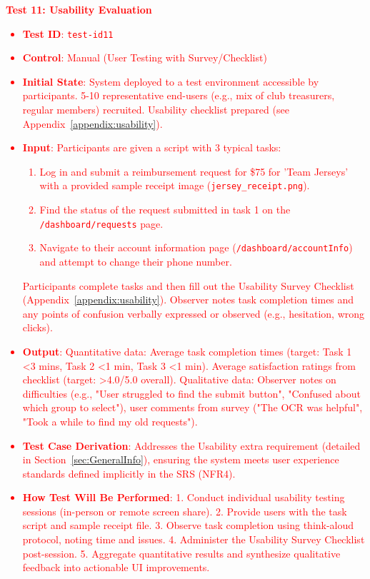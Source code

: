 \documentclass[12pt, titlepage]{article}
\begin{document}
\textcolor{red}{
\textbf{Test 11: Usability Evaluation} \label{test-id11}
\begin{itemize}
    \item \textbf{Test ID}: \texttt{test-id11}
    \item \textbf{Control}: Manual (User Testing with Survey/Checklist)
    \item \textbf{Initial State}: System deployed to a test environment accessible by participants. 5-10 representative end-users (e.g., mix of club treasurers, regular members) recruited. Usability checklist prepared (see Appendix~\ref{appendix:usability}).
    \item \textbf{Input}: Participants are given a script with 3 typical tasks:
        \begin{enumerate}
            \item Log in and submit a reimbursement request for \$75 for 'Team Jerseys' with a provided sample receipt image (\texttt{jersey\_receipt.png}).
            \item Find the status of the request submitted in task 1 on the \texttt{/dashboard/requests} page.
            \item Navigate to their account information page (\texttt{/dashboard/accountInfo}) and attempt to change their phone number.
        \end{enumerate}
        Participants complete tasks and then fill out the Usability Survey Checklist (Appendix~\ref{appendix:usability}). Observer notes task completion times and any points of confusion verbally expressed or observed (e.g., hesitation, wrong clicks).
    \item \textbf{Output}: Quantitative data: Average task completion times (target: Task 1 \textless 3 mins, Task 2 \textless 1 min, Task 3 \textless 1 min). Average satisfaction ratings from checklist (target: \textgreater 4.0/5.0 overall). Qualitative data: Observer notes on difficulties (e.g., "User struggled to find the submit button", "Confused about which group to select"), user comments from survey ("The OCR was helpful", "Took a while to find my old requests").
    \item \textbf{Test Case Derivation}: Addresses the Usability extra requirement (detailed in Section~\ref{sec:GeneralInfo}), ensuring the system meets user experience standards defined implicitly in the SRS (NFR4).
    \item \textbf{How Test Will Be Performed}: 1. Conduct individual usability testing sessions (in-person or remote screen share). 2. Provide users with the task script and sample receipt file. 3. Observe task completion using think-aloud protocol, noting time and issues. 4. Administer the Usability Survey Checklist post-session. 5. Aggregate quantitative results and synthesize qualitative feedback into actionable UI improvements.
\end{itemize}
}
\end{document}
